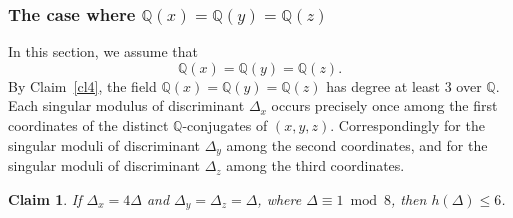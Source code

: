 \documentclass[11pt,a4paper, british]{amsart}
\newtheorem{claim}[thm]{Claim}
\theoremstyle{definition}
\theoremstyle{remark}
\numberwithin{equation}{section}
\newcommand{\Q}{\mathbb{Q}} %
\begin{document}
\subsubsection{The case where $\Q(x) = \Q(y) = \Q(z)$}\label{subsubsec:equalfielddisc}

In this section, we assume that
\[ \Q(x) = \Q(y) = \Q(z).\]
By Claim~\ref{cl4}, the field $\Q(x) = \Q(y) = \Q(z)$ has degree at least $3$ over $\Q$. Each singular modulus of discriminant $\Delta_x$ occurs precisely once among the first coordinates of the distinct $\Q$-conjugates of $(x, y, z)$. Correspondingly for the singular moduli of discriminant $\Delta_y$ among the second coordinates, and for the singular moduli of discriminant $\Delta_z$ among the third coordinates.

\begin{claim}\label{cl10}
	If $\Delta_x = 4 \Delta$ and $\Delta_y = \Delta_z = \Delta$, where $\Delta \equiv 1 \bmod 8$, then $h(\Delta) \leq 6$.
\end{claim}
\end{document}
